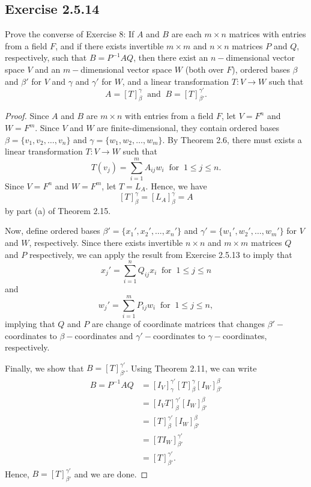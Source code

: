 \subsection*{Exercise 2.5.14}\label{Exercise 2.5.14} Prove the converse of Exercise 8: If \( A  \) and \( B  \) are each \( m \times n  \) matrices with entries from a field \( F \), and if there exists invertible \( m \times m  \) and \( n \times n  \) matrices \( P  \) and \( Q  \), respectively, such that \( B = P^{-1} A Q  \), then there exist an \( n- \)dimensional vector space \( V  \) and an \( m- \)dimensional vector space \( W  \) (both over \( F \)), ordered bases \( \beta \) and \( \beta'  \) for \( V  \) and \( \gamma \) and \( \gamma'  \) for \( W  \), and a linear transformation \( T: V \to W  \) such that
\[  A = [T]_{\beta}^{\gamma}  \ \text{ and } \ B = [T]_{\beta'}^{\gamma'}. \]
\begin{proof}
    Since \( A  \) and \( B  \) are \( m \times n  \) with entries from a field \( F  \), let \( V = F^{n} \) and \( W = F^{m} \). Since \( V \) and \( W  \) are finite-dimensional, they contain ordered bases \( \beta =  \{ {v}_{1}, {v}_{2}, \dots, {v}_{n} \} \) and \( \gamma = \{ {w}_{1}, {w}_{2}, \dots, {w}_{m} \}   \). By Theorem 2.6, there must exists a linear transformation \( T: V \to W  \) such that 
    \[  T({v}_{j}) = \sum_{ i=1  }^{ m } {A}_{ij} {w}_{i} \ \text{ for } \ 1 \leq j \leq n. \]
    Since \( V = F^{n} \) and \( W = F^{m} \), let \( T = {L}_{A} \). Hence, we have
    \[  [T]_{\beta}^{\gamma} = [{L}_{A}]_{\beta}^{\gamma} = A  \]
    by part (a) of Theorem 2.15.
    
    Now, define ordered bases \( \beta' = \{ {x}_{1}', {x}_{2}', \dots, {x}_{n}' \}  \) and \( \gamma' = \{ {w}_{1}', {w}_{2}', \dots, {w}_{m}' \}  \) for \( V  \) and \( W  \), respectively. Since there exists invertible \( n \times n \) and \( m \times m  \) matrices \( Q  \) and \( P  \) respectively, we can apply the result from Exercise 2.5.13 to imply that
    \[  {x}_{j }' = \sum_{ i=1  }^{ n } {Q}_{ij} {x}_{i} \ \text{ for } \ 1 \leq j \leq n  \] and 
    \[  {w}_{j}' = \sum_{ i=1  }^{ m } {P}_{ij} {w}_{i} \ \text{ for } \ 1 \leq j \leq n ,  \]
    implying that \( Q  \) and \( P  \) are change of coordinate matrices that changes \( \beta'- \)coordinates to \( \beta- \)coordinates and \( \gamma'-\)coordinates to \( \gamma- \)coordinates, respectively. 

    Finally, we show that \( B = [T]_{\beta'}^{\gamma'}  \). Using Theorem 2.11, we can write
    \begin{align*}
        B = P^{-1} A Q &= [{I}_{V}]_{\gamma}^{\gamma'} [T]_{\beta}^{\gamma} [{I}_{W}]_{\beta'}^{\beta}    \\
                       &= [{I}_{V} T ]_{\beta}^{\gamma'} [{I}_{W}]_{\beta'}^{\beta}  \\
                       &= [T]_{\beta}^{\gamma'} [{I}_{W}]_{\beta'}^{\beta}  \\
                       &= [T {I}_{W}]_{\beta'}^{\gamma'}  \\
                       &= [T]_{\beta'}^{\gamma'}.
    \end{align*}
    Hence, \( B = [T]_{\beta'}^{\gamma'}  \) and we are done.
\end{proof}

